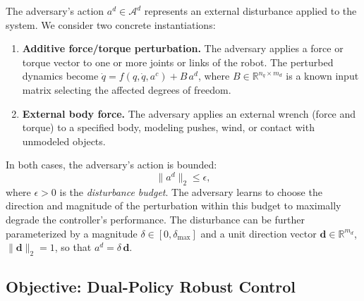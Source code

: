 \documentclass[conference]{IEEEtran}
\newcommand{\R}{\mathbb{R}}
\newcommand{\cA}{\mathcal{A}}
\begin{document}
The adversary's action $a^d \in \cA^d$ represents an external disturbance
applied to the system.  We consider two concrete instantiations:
\begin{enumerate}
\item \textbf{Additive force/torque perturbation.}  The adversary applies
  a force or torque vector to one or more joints or links of the robot.
  The perturbed dynamics become
  $\dot{q} = f(q, \dot{q}, a^c) + B\,a^d$, where
  $B \in \R^{n_q \times m_d}$ is a known input matrix selecting the
  affected degrees of freedom.
\item \textbf{External body force.}  The adversary applies an external
  wrench (force and torque) to a specified body, modeling pushes, wind,
  or contact with unmodeled objects.
\end{enumerate}

In both cases, the adversary's action is bounded:
\begin{equation}\label{eq:dist_budget}
\|a^d\|_2 \leq \epsilon,
\end{equation}
where $\epsilon > 0$ is the \emph{disturbance budget}.  The adversary
learns to choose the direction and magnitude of the perturbation within
this budget to maximally degrade the controller's performance.  The
disturbance can be further parameterized by a magnitude
$\delta \in [0, \delta_{\max}]$ and a unit direction vector
$\boldsymbol{d} \in \R^{m_d}$, $\|\boldsymbol{d}\|_2 = 1$, so that
$a^d = \delta\,\boldsymbol{d}$.

\subsection{Objective: Dual-Policy Robust Control}\label{sec:objective}
\end{document}
